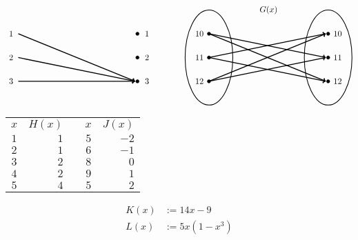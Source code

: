 \documentclass[12pt,letterpaper]{exam}
\begin{document}
\begin{questions}
\[\begin{tikzpicture}
	\draw[fill=black] (5,1) circle (0.07);
	\draw[fill=black] (5,0) circle (0.07);
	\draw[fill=black] (5,-1) circle (0.07);
	
	\draw[line width=0.04cm,->] (0,1) -- (4.9,-1);
	\draw[line width=0.04cm,->] (0,0) -- (4.9,-1);
	\draw[line width=0.04cm,->] (0,-1) -- (4.9,-1);
	
	\node at (-0.3,1) {$1$};
	\node at (-0.3,0) {$2$};
	\node at (-0.3,-1) {$3$};
	
	\node at (5.4,1) {$1$};
	\node at (5.4,0) {$2$};
	\node at (5.4,-1) {$3$};
	
	\tikzset{shift={(8,0)}}
	\node at (2.5,2) {$G(x)$};
	
	\draw[line width=0.03cm] (0,0) circle (1 and 2);
	\draw[line width=0.03cm] (5,0) circle (1 and 2);
	
	\draw[fill=black] (0,1) circle (0.07);
	\draw[fill=black] (0,0) circle (0.07);
	\draw[fill=black] (0,-1) circle (0.07);
	
	\draw[fill=black] (5,1) circle (0.07);
	\draw[fill=black] (5,0) circle (0.07);
	\draw[fill=black] (5,-1) circle (0.07);
	
	\draw[line width=0.04cm,->] (0,1) -- (4.9,0);
	\draw[line width=0.04cm,->] (0,1) -- (4.9,-1);
	\draw[line width=0.04cm,->] (0,0) -- (4.9,1);
	\draw[line width=0.04cm,->] (0,0) -- (4.9,-1);
	\draw[line width=0.04cm,->] (0,-1) -- (4.9,1);
	\draw[line width=0.04cm,->] (0,-1) -- (4.9,0);
	
	\node at (-0.4,1) {$10$};
	\node at (-0.4,0) {$11$};
	\node at (-0.4,-1) {$12$};
	
	\node at (5.4,1) {$10$};
	\node at (5.4,0) {$11$};
	\node at (5.4,-1) {$12$};
	\end{tikzpicture}
	\] \pspace

	\begin{minipage}[b]{0.49\textwidth}
	\centering
	\begin{tabular}{c|rcc|r}
	$x$ & $H(x)$ & \hspace{1cm} & $x$ & $J(x)$ \\ \cline{1-2} \cline{4-5}
	$1$ & $1$ & & $5$ & $-2$ \\
	$2$ & $1$ & & $6$ & $-1$ \\
	$3$ & $2$ & & $8$ & $0$ \\
	$4$ & $2$ & & $9$ & $1$ \\
	$5$ & $4$ & & $5$ & $2$
	\end{tabular}
	\end{minipage}
	\begin{minipage}[b]{0.49\textwidth}
	\[
	\begin{aligned}
	K(x)&:= 14x - 9 \\[0.6cm]
	L(x)&:= 5x(1 - x^3)
	\end{aligned}
	\]
	\end{minipage} \pvspace{0.6cm}
	

\end{questions}
\end{document}

